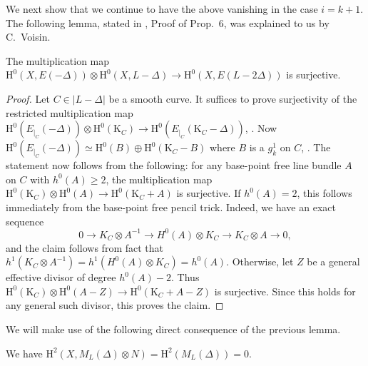 We next show that we continue to have the above vanishing in the case $i=k+1$. The following lemma, stated in \cite{V1}, Proof of Prop.\ 6, was explained to us by C.\ Voisin.
\begin{lem}
\notready \label{LM-mult-map}
The multiplication map $\mathrm{H}^0(X,E(-\Delta)) \otimes \mathrm{H}^0(X,L-\Delta) \to \mathrm{H}^0(X,E(L-2\Delta))$ is surjective.
\end{lem}
\begin{proof}
Let $C \in |L-\Delta|$ be a smooth curve. It suffices to prove surjectivity of the restricted multiplication map $\mathrm{H}^0(E_{|_C}(-\Delta)) \otimes \mathrm{H}^0(\mathrm{K}_C) \to \mathrm{H}^0(E_{|_C}(\mathrm{K}_C-\Delta))$, \cite[Observation 2.3]{gallego-purnaprajna}. Now $\mathrm{H}^0(E_{|_C}(-\Delta)) \simeq \mathrm{H}^0(B) \oplus \mathrm{H}^0(\mathrm{K}_C-B)$ where $B$ is a $g^1_k$ on $C$, \cite{voisin-wahl}. The statement now follows from the following: for any base-point free line bundle $A$ on $C$ with $h^0(A) \geq 2$, the multiplication map $\mathrm{H}^0(\mathrm{K}_C) \otimes \mathrm{H}^0(A) \to \mathrm{H}^0(\mathrm{K}_C+A)$ is surjective. If $h^0(A)=2$, this follows immediately from the base-point free pencil trick. Indeed, we have an exact sequence
$$0 \to K_C \otimes A^{-1} \to H^0(A) \otimes K_C \to K_C \otimes A \to 0,$$
and the claim follows from fact that $h^1(K_C \otimes A^{-1})=h^1(H^0(A) \otimes K_C )=h^0(A)$. Otherwise, let $Z$ be a general effective divisor of degree $h^0(A)-2$. Thus $\mathrm{H}^0(\mathrm{K}_C) \otimes \mathrm{H}^0(A-Z) \to \mathrm{H}^0(\mathrm{K}_C+A-Z)$ is surjective. Since this holds for any general such divisor, this proves the claim.
\end{proof}
We will make use of the following direct consequence of the previous lemma.
\begin{lem}
\notready \label{mult-maps}
We have $\mathrm{H}^2(X,M_L(\Delta) \otimes N)=\mathrm{H}^2(M_L(\Delta))=0$.
\end{lem}
